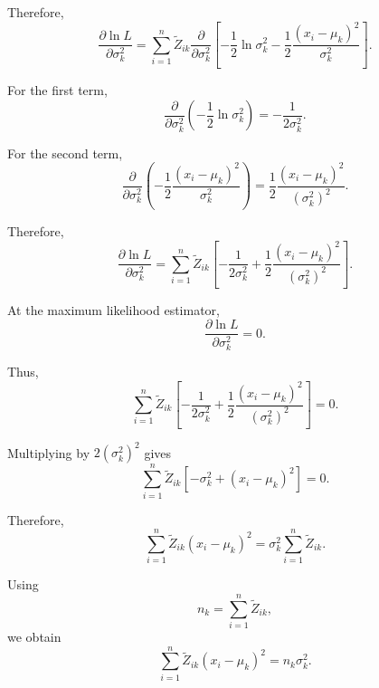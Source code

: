Therefore,
\begin{equation*}
\frac{\partial\ln L}{\partial\sigma_k^2}
=
\sum_{i=1}^n
\tilde{Z}_{ik}
\frac{\partial}{\partial\sigma_k^2}
\left[
-\frac{1}{2}\ln\sigma_k^2
-\frac{1}{2}
\frac{(x_i-\mu_k)^2}{\sigma_k^2}
\right].
\end{equation*}

For the first term,
\begin{equation*}
\frac{\partial}{\partial\sigma_k^2}
\left(
-\frac{1}{2}\ln\sigma_k^2
\right)
=
-\frac{1}{2\sigma_k^2}.
\end{equation*}

For the second term,
\begin{equation*}
\frac{\partial}{\partial\sigma_k^2}
\left(
-\frac{1}{2}
\frac{(x_i-\mu_k)^2}{\sigma_k^2}
\right)
=
\frac{1}{2}
\frac{(x_i-\mu_k)^2}{(\sigma_k^2)^2}.
\end{equation*}

Therefore,
\begin{equation*}
\frac{\partial\ln L}{\partial\sigma_k^2}
=
\sum_{i=1}^n
\tilde{Z}_{ik}
\left[
-\frac{1}{2\sigma_k^2}
+
\frac{1}{2}
\frac{(x_i-\mu_k)^2}{(\sigma_k^2)^2}
\right].
\end{equation*}

At the maximum likelihood estimator,
\begin{equation*}
\frac{\partial\ln L}{\partial\sigma_k^2}=0.
\end{equation*}

Thus,
\begin{equation*}
\sum_{i=1}^n
\tilde{Z}_{ik}
\left[
-\frac{1}{2\sigma_k^2}
+
\frac{1}{2}
\frac{(x_i-\mu_k)^2}{(\sigma_k^2)^2}
\right]
=
0.
\end{equation*}

Multiplying by $2(\sigma_k^2)^2$ gives
\begin{equation*}
\sum_{i=1}^n
\tilde{Z}_{ik}
\left[
-\sigma_k^2
+
(x_i-\mu_k)^2
\right]
=
0.
\end{equation*}

Therefore,
\begin{equation*}
\sum_{i=1}^n
\tilde{Z}_{ik}(x_i-\mu_k)^2
=
\sigma_k^2
\sum_{i=1}^n\tilde{Z}_{ik}.
\end{equation*}

Using
\begin{equation*}
n_k=\sum_{i=1}^n\tilde{Z}_{ik},
\end{equation*}
we obtain
\begin{equation*}
\sum_{i=1}^n
\tilde{Z}_{ik}(x_i-\mu_k)^2
=
n_k\sigma_k^2.
\end{equation*}

